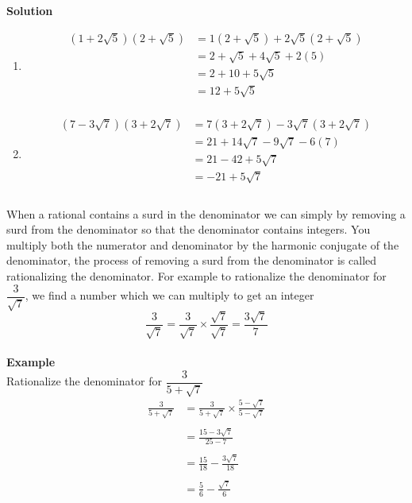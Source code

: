 \documentclass[11pt,a4paper]{article}
\begin{document}
\textbf{Solution}
\begin{enumerate}
\item
\begin{align*}
(1+2\sqrt{5})(2+\sqrt{5}) &= 1(2+\sqrt{5})+2\sqrt{5}(2+\sqrt{5})\\
& = 2 + \sqrt{5}+4\sqrt{5}+2(5)\\
& = 2 + 10 +5\sqrt{5}\\
& = 12+5\sqrt{5}\\
\end{align*}

\item
\begin{align*}
(7-3\sqrt{7})(3+2\sqrt{7}) & = 7(3+2\sqrt{7})-3\sqrt{7}(3+2\sqrt{7})\\
& = 21 + 14\sqrt{7}-9\sqrt{7}-6(7)\\
& = 21-42+5\sqrt{7}\\
& = -21+5\sqrt{7}\\\\
\end{align*}
\end{enumerate}


When a rational contains a surd in the denominator we can simply by removing a surd from the denominator so that the denominator contains integers. You multiply both the numerator and denominator by the harmonic conjugate of the denominator, the process of removing a surd from the denominator is called rationalizing the denominator. For example to rationalize the denominator for $\dfrac{3}{\sqrt{7}}$, we find a number which we can multiply to get an integer $$\frac{3}{\sqrt{7}}=\frac{3}{\sqrt{7}} \times \frac{\sqrt{7}}{\sqrt{7}}=\frac{3\sqrt{7}}{7}$$\\

\textbf{Example}\\
Rationalize the denominator for $\dfrac{3}{5+\sqrt{7}}$\\
\begin{align*}
\frac{3}{5+\sqrt{7}} & =\frac{3}{5+\sqrt{7}}\times \frac{5-\sqrt{7}}{5-\sqrt{7}}\\\\
& = \frac{15-3\sqrt{7}}{25-7}\\\\
& =\frac{15}{18}-\frac{3\sqrt{7}}{18}\\\\
& = \frac{5}{6}-\frac{\sqrt{7}}{6}\\\\
\end{align*}
\end{document}
